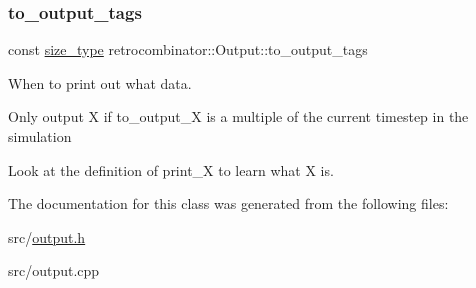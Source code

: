 \subsubsection{\texorpdfstring{to\+\_\+output\+\_\+tags}{to\_output\_tags}}
{\footnotesize\ttfamily const \hyperlink{constants_8h_a8e1541b50cee66a791df4c437ccbb385}{size\+\_\+type} retrocombinator\+::\+Output\+::to\+\_\+output\+\_\+tags\hspace{0.3cm}{\ttfamily [private]}}



When to print out what data. 


\begin{DoxyItemize}
\item Only output X if {\ttfamily to\+\_\+output\+\_\+X} is a multiple of the current timestep in the simulation
\item Look at the definition of print\+\_\+\textquotesingle{}X\textquotesingle{} to learn what \textquotesingle{}X\textquotesingle{} is. 
\end{DoxyItemize}

The documentation for this class was generated from the following files\+:\begin{DoxyCompactItemize}
\item 
src/\hyperlink{output_8h}{output.\+h}\item 
src/output.\+cpp\end{DoxyCompactItemize}
